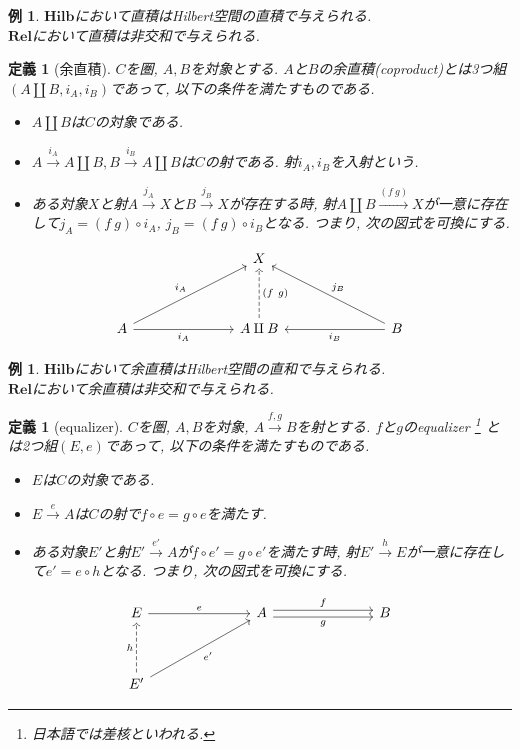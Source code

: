 \documentclass[a4paper,12pt]{ltjsarticle}
\theoremstyle{break}
\newtheorem{defn}[thm]{定義}
\newtheorem{eg}[thm]{例}
\newcommand{\rel}{\mathbf{Rel}}
\newcommand{\hilb}{\mathbf{Hilb}}
\newcommand{\xr}[1]{\xrightarrow{#1}}
\newcommand{\ci}{\circ}
\newcommand{\am}{\amalg}
\numberwithin{equation}{section}
\begin{document}
\begin{eg}
  $\hilb$において直積はHilbert空間の直積で与えられる. \\
  $\rel$において直積は非交和で与えられる. 
\end{eg}

\begin{defn}[余直積]
  $C$を圏, $A, B$を対象とする. 
  $A$と$B$の余直積(coproduct)とは3つ組$(A \am B, i_A, i_B)$であって, 以下の条件を満たすものである.
  \begin{itemize} 
    \item $A \am B$は$C$の対象である. 
    \item $A \xr{i_A} A \am B, B \xr{i_B} A \am B$は$C$の射である. 射$i_A,i_B$を入射という. 
    \item ある対象$X$と射$A \xr{j_A} X$と$B \xr{j_B} X$が存在する時, 射$A \am B \xr{(f~g)} X$が一意に存在して$j_A = (f~g) \ci i_A$, $j_B = (f~g) \ci i_B$となる. 
    つまり, 次の図式を可換にする. 
  \end{itemize}   
  \[\begin{tikzcd}
    &&& X \\
    \\
    A &&& {A \am B} &&& B
    \arrow["{(f~g)}"', dashed,  from=3-4, to=1-4]
    \arrow["{i_A}", from=3-1, to=1-4]
    \arrow["{i_A}"', from=3-1, to=3-4]
    \arrow["{j_B}"', from=3-7, to=1-4]
    \arrow["{i_B}", from=3-7, to=3-4]
  \end{tikzcd}\]
\end{defn}

\begin{eg}
  $\hilb$において余直積はHilbert空間の直和で与えられる. \\
  $\rel$において余直積は非交和で与えられる. 
\end{eg}

\begin{defn}[equalizer]
  $C$を圏, $A, B$を対象, $A \xr{f,g} B$を射とする. 
  $f$と$g$のequalizer
  \footnote{
      日本語では差核といわれる.
    }
  とは2つ組$(E, e)$であって, 以下の条件を満たすものである. 
  \begin{itemize}
    \item $E$は$C$の対象である. 
    \item $E \xr{e} A$は$C$の射で$f \ci e = g \ci e$を満たす. 
    \item ある対象$E'$と射$E' \xr{e'} A$が$f \ci e' = g \ci e'$を満たす時, 射$E' \xr{h} E$が一意に存在して$e' = e \ci h$となる. 
    つまり, 次の図式を可換にする. 
  \end{itemize}
  \[\begin{tikzcd}
	  E &&& A &&& B \\
	  \\
	  {E'}
	  \arrow["g"', shift right=1, from=1-4, to=1-7]
	  \arrow["{e'}"', from=3-1, to=1-4]
	  \arrow["e", from=1-1, to=1-4]
	  \arrow["h", from=3-1, dashed, to=1-1]
	  \arrow["f", shift left=1, from=1-4, to=1-7]
  \end{tikzcd}\]
\end{defn}
\end{document}
